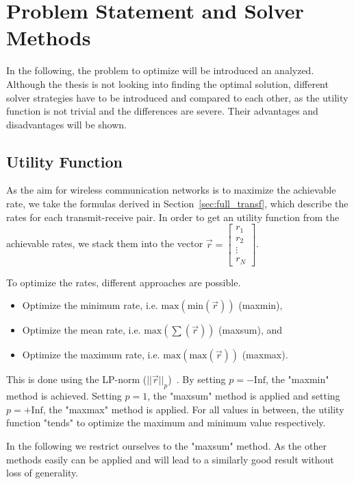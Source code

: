 \chapter{Problem Statement and Solver Methods}
\label{sec:solver}

In the following, the problem to optimize will be introduced an analyzed.
Although the thesis is not looking into finding the optimal solution, different solver strategies have to be introduced and compared to each other, as the utility function is not trivial and the differences are severe.
Their advantages and disadvantages will be shown.

\section{Utility Function}
\label{sec:utility_function}
As the aim for wireless communication networks is to maximize the achievable rate, we take the formulas derived in Section~\ref{sec:full_transf}, which describe the rates for each transmit-receive pair.
In order to get an utility function from the achievable rates, we stack them into the vector $\vec{r} = \begin{bmatrix}
r_1 \\ r_2 \\ \vdots \\ r_N
\end{bmatrix}$.

To optimize the rates, different approaches are possible.
\begin{itemize}
\item Optimize the minimum rate, i.e. $\text{max}\left(\text{min}(\vec{r})\right)$ (maxmin),
\item Optimize the mean rate, i.e. $\text{max}\left(\sum(\vec{r})\right)$ (maxsum), and
\item Optimize the maximum rate, i.e. $\text{max}\left(\text{max}(\vec{r})\right)$ (maxmax).
\end{itemize}

This is done using the LP-norm ($||\vec{r}||_p$)~\cite{wiki:lp_space}.
By setting $p = -\text{Inf}$, the "maxmin" method is achieved.
Setting $p = 1$, the "maxsum" method is applied and setting $p = +\text{Inf}$, the "maxmax" method is applied.
For all values in between, the utility function "tends" to optimize the maximum and minimum value respectively.

In the following we restrict ourselves to the "maxsum" method.
As the other methods easily can be applied and will lead to a similarly good result without loss of generality.

